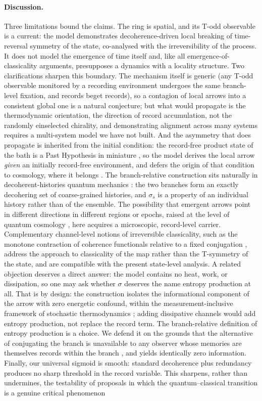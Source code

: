 \documentclass[11pt]{article}
\begin{document}
\paragraph{Discussion.}
Three limitations bound the claims. The ring is spatial, and its T-odd observable is a current: the model demonstrates decoherence-driven local breaking of time-reversal symmetry of the state, co-analysed with the irreversibility of the process. It does not model the emergence of time itself and, like all emergence-of-classicality arguments, presupposes a dynamics with a locality structure. Two clarifications sharpen this boundary. The mechanism itself is generic (any T-odd observable monitored by a recording environment undergoes the same branch-level fixation, and records beget records), so a contagion of local arrows into a consistent global one is a natural conjecture; but what would propagate is the thermodynamic orientation, the direction of record accumulation, not the randomly einselected chirality, and demonstrating alignment across many systems requires a multi-system model we have not built. And the asymmetry that does propagate is inherited from the initial condition: the record-free product state of the bath is a Past Hypothesis in miniature \cite{Chen2024}, so the model derives the local arrow \emph{given} an initially record-free environment, and defers the origin of that condition to cosmology, where it belongs \cite{Halliwell1994}. The branch-relative construction sits naturally in decoherent-histories quantum mechanics \cite{GellMann1993}: the two branches form an exactly decohering set of coarse-grained histories, and $\sigma_s$ is a property of an individual history rather than of the ensemble. The possibility that emergent arrows point in different directions in different regions or epochs, raised at the level of quantum cosmology \cite{Hartle2013}, here acquires a microscopic, record-level carrier. Complementary channel-level notions of irreversible classicality, such as the monotone contraction of coherence functionals relative to a fixed conjugation \cite{Gil2026}, address the approach to classicality of the map rather than the T-symmetry of the state, and are compatible with the present state-level analysis. A related objection deserves a direct answer: the model contains no heat, work, or dissipation, so one may ask whether $\sigma$ deserves the name entropy production at all. That is by design: the construction isolates the informational component of the arrow with zero energetic confound, within the measurement-inclusive framework of stochastic thermodynamics \cite{Landi2021}; adding dissipative channels would add entropy production, not replace the record term. The branch-relative definition of entropy production is a choice. We defend it on the grounds that the alternative of conjugating the branch is unavailable to any observer whose memories are themselves records within the branch \cite{Mlodinow2014}, and yields identically zero information. Finally, our universal sigmoid is smooth: standard decoherence plus redundancy produces no sharp threshold in the record variable. This sharpens, rather than undermines, the testability of proposals in which the quantum--classical transition is a genuine critical phenomenon 
\end{document}
